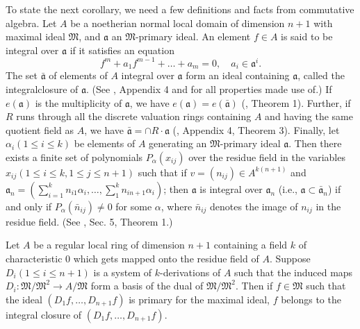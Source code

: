 To state the next corollary, we need a few definitions and facts from commutative algebra. Let $A$ be a noetherian normal local domain of dimension $n+1$ with maximal ideal $\mathfrak{M}$, and $\mathfrak{a}$ an $\mathfrak{M}$-primary ideal. An element $f \in A$ is said to be integral over $\mathfrak{a}$ if it satisfies an equation
$$
f^m + a_1 f^{m-1} + \ldots + a_m = 0, \quad a_i \in \mathfrak{a}^i.
$$
The set $\bar{\mathfrak{a}}$ of elements of $A$ integral over $\mathfrak{a}$ form an ideal containing $\mathfrak{a}$, called the integral\pageoriginale closure of $\mathfrak{a}$. (See \cite{art10-key13}, Appendix 4 and \cite{art10-key10} for all properties made use of.) If $e(\mathfrak{a})$ is the multiplicity of $\mathfrak{a}$, we have $e(\mathfrak{a}) = e(\bar{\mathfrak{a}})$ (\cite{art10-key10}, Theorem 1). Further, if $R$ runs through all the discrete valuation rings containing $A$ and having the same quotient field as $A$, we have $\bar{\mathfrak{a}} = \cap R \cdot \mathfrak{a}$ (\cite{art10-key13}, Appendix 4, Theorem 3). Finally, let $\alpha_i (1 \leqslant i \leqslant k)$ be elements of $A$ generating an $\mathfrak{M}$-primary ideal $\mathfrak{a}$. Then there exists a finite set of polynomials $P_\alpha (x_{ij})$ over the residue field in the variables $x_{ij} (1 \leqslant i \leqslant k, 1 \leqslant j \leqslant n +1)$ such that if 
$v = (n_{ij}) \in A^{k(n+1)}$ and $\mathfrak{a}_n = (\sum^k_{i=1} n_{i1} \alpha_i, \ldots, \sum^k_1 n_{in+1} \alpha_i)$; then $\mathfrak{a}$ is integral over $\mathfrak{a}_n$ (i.e., $\mathfrak{a} \subset \bar{\mathfrak{a}}_n$) if and only if $P_\alpha (\bar{n}_{ij}) \neq 0$ for some $\alpha$, where $\bar{n}_{ij}$ denotes the image of $n_{ij}$ in the residue field. (See \cite{art10-key10}, Sec. 5, Theorem 1.)

\begin{lemma}\label{art10-lem2.6}
Let $A$ be a regular local ring of dimension $n+1$ containing a field $k$ of characteristic 0 which gets mapped onto the residue field of $A$. Suppose $D_i (1 \leqslant  i \leqslant n +1)$ is a system of $k$-derivations of $A$ such that the induced maps $D_i: \mathfrak{M}/ \mathfrak{M}^2 \to A / \mathfrak{M}$ form a basis of the dual of $\mathfrak{M} / \mathfrak{M}^2$. Then if $f \in \mathfrak{M}$ such that the ideal $(D_1 f, \ldots, D_{n+1}f )$ is primary for the maximal ideal, $f$ belongs to the integral closure of $(D_1 f, \ldots, D_{n+1}f)$.
\end{lemma}

